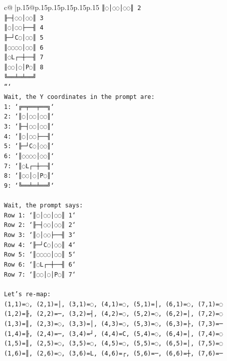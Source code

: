 \documentclass{article}
\begin{document}
{\begin{supertabular}{c@{$\;$}|p{.15\linewidth}@{}p{.15\linewidth}p{.15\linewidth}p{.15\linewidth}p{.15\linewidth}p{.15\linewidth}}
{{{\texttt{║◌│◌◌│◌◌║ 2} \\
\texttt{╟─┤◌◌│◌◌║ 3} \\
\texttt{║◌│◌◌├──╢ 4} \\
\texttt{╟─┘C◌│◌◌║ 5} \\
\texttt{║◌◌◌◌│◌◌║ 6} \\
\texttt{║◌L┌─┼──╢ 7} \\
\texttt{║◌◌│◌│P◌║ 8} \\
\texttt{╚══╧═╧══╝} \\
\texttt{```} \\
\texttt{Wait, the Y coordinates in the prompt are:} \\
\texttt{1: `╔═╤══╤══╗`} \\
\texttt{2: `║◌│◌◌│◌◌║`} \\
\texttt{3: `╟─┤◌◌│◌◌║`} \\
\texttt{4: `║◌│◌◌├──╢`} \\
\texttt{5: `╟─┘C◌│◌◌║`} \\
\texttt{6: `║◌◌◌◌│◌◌║`} \\
\texttt{7: `║◌L┌─┼──╢`} \\
\texttt{8: `║◌◌│◌│P◌║`} \\
\texttt{9: `╚══╧═╧══╝`} \\
\\ 
\texttt{Wait, the prompt says:} \\
\texttt{Row 1: `║◌│◌◌│◌◌║ 1`} \\
\texttt{Row 2: `╟─┤◌◌│◌◌║ 2`} \\
\texttt{Row 3: `║◌│◌◌├──╢ 3`} \\
\texttt{Row 4: `╟─┘C◌│◌◌║ 4`} \\
\texttt{Row 5: `║◌◌◌◌│◌◌║ 5`} \\
\texttt{Row 6: `║◌L┌─┼──╢ 6`} \\
\texttt{Row 7: `║◌◌│◌│P◌║ 7`} \\
\\ 
\texttt{Let's re{-}map:} \\
\texttt{(1,1)=◌, (2,1)=│, (3,1)=◌, (4,1)=◌, (5,1)=│, (6,1)=◌, (7,1)=◌} \\
\texttt{(1,2)=╟, (2,2)=─, (3,2)=┤, (4,2)=◌, (5,2)=◌, (6,2)=│, (7,2)=◌} \\
\texttt{(1,3)=║, (2,3)=◌, (3,3)=│, (4,3)=◌, (5,3)=◌, (6,3)=├, (7,3)=─} \\
\texttt{(1,4)=╟, (2,4)=─, (3,4)=┘, (4,4)=C, (5,4)=◌, (6,4)=│, (7,4)=◌} \\
\texttt{(1,5)=║, (2,5)=◌, (3,5)=◌, (4,5)=◌, (5,5)=◌, (6,5)=│, (7,5)=◌} \\
\texttt{(1,6)=║, (2,6)=◌, (3,6)=L, (4,6)=┌, (5,6)=─, (6,6)=┼, (7,6)=─} \\
}}}
\end{supertabular}}
\end{document}
